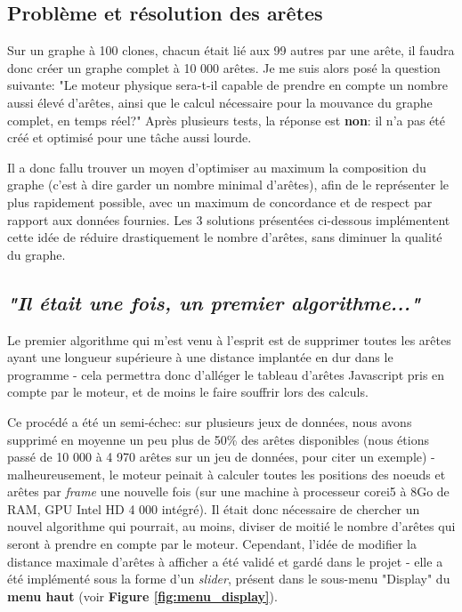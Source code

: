 \documentclass[pdftex,12pt,a4paper]{report}
\begin{document}
\begin{spacing}{1.2}
\section{Problème et résolution des arêtes}

Sur un graphe à 100 clones, chacun était lié aux 99 autres par une arête, il faudra donc créer un graphe complet à 10 000 arêtes. 
Je me suis alors posé la question suivante: "Le moteur physique sera-t-il capable de prendre en compte un nombre aussi élevé d'arêtes, ainsi que le calcul nécessaire pour la mouvance du graphe complet, en temps réel?"
Après plusieurs tests, la réponse est \textbf{non}: il n'a pas été créé et optimisé pour une tâche aussi lourde.

Il a donc fallu trouver un moyen d'optimiser au maximum la composition du graphe (c'est à dire garder un nombre minimal d'arêtes), afin de le représenter le plus rapidement possible, avec un maximum de concordance et de respect par rapport aux données fournies.
Les 3 solutions présentées ci-dessous implémentent cette idée de réduire drastiquement le nombre d'arêtes, sans diminuer la qualité du graphe.

\subsection{\textit{"Il était une fois, un premier algorithme..."}}
Le premier algorithme qui m'est venu à l'esprit est de supprimer toutes les arêtes ayant une longueur supérieure à une distance implantée en dur dans le programme - cela permettra donc d'alléger le tableau d'arêtes Javascript pris en compte par le moteur, et de moins le faire souffrir lors des calculs.

Ce procédé a été un semi-échec: sur plusieurs jeux de données, nous avons supprimé en moyenne un peu plus de 50\% des arêtes disponibles (nous étions passé de 10 000 à 4 970 arêtes sur un jeu de données, pour citer un exemple) - malheureusement, le moteur peinait à calculer toutes les positions des noeuds et arêtes par \textit{frame} une nouvelle fois (sur une machine à processeur corei5 à 8Go de RAM, GPU Intel HD 4 000 intégré).
Il était donc nécessaire de chercher un nouvel algorithme qui pourrait, au moins, diviser de moitié le nombre d'arêtes qui seront à prendre en compte par le moteur. Cependant, l'idée de modifier la distance maximale d'arêtes à afficher a été validé et gardé dans le projet - elle a été implémenté sous la forme d'un \textit{slider}, présent dans le sous-menu "Display" du \textbf{menu haut} (voir \textbf{Figure \ref{fig:menu_display}}).


\end{spacing}
\end{document}
